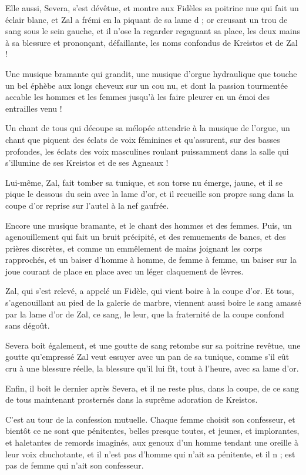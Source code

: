 \documentclass[a4paper, 11pt, oneside, polutonikogreek, french]{article}
\begin{document}
Elle aussi, Severa, s'est dévêtue, et montre aux Fidèles sa poitrine nue qui fait un éclair blanc, et Zal a frémi en la piquant de sa lame d ; or creusant un trou de sang sous le sein gauche, et il n'ose la regarder regagnant sa place, les deux mains à sa blessure et prononçant, défaillante, les noms confondus de Kreistos et de Zal !

Une musique bramante qui grandit, une musique d’orgue hydraulique que touche un bel éphèbe aux longs cheveux sur un cou nu, et dont la passion tourmentée accable les hommes et les femmes jusqu'à les faire pleurer en un émoi des entrailles venu !

Un chant de tous qui découpe sa mélopée attendrie à la musique de l'orgue, un chant que piquent des éclats de voix féminines et qu'assurent, sur des basses profondes, les éclats des voix masculines roulant puissamment dans la salle qui s'illumine de ses Kreistos et de ses Agneaux !

Lui-même, Zal, fait tomber sa tunique, et son torse nu émerge, jaune, et il se pique le dessous du sein avec la lame d'or, et il recueille son propre sang dans la coupe d'or reprise sur l'autel à la nef gaufrée.

Encore une musique bramante, et le chant des hommes et des femmes. Puis, un agenouillement qui fait un bruit précipité, et des remuements de bancs, et des prières discrètes, et comme un emmêlement de mains joignant les corps rapprochés, et un baiser d'homme à homme, de femme à femme, un baiser sur la joue courant de place en place avec un léger claquement de lèvres.

Zal, qui s'est relevé, a appelé un Fidèle, qui vient boire à la coupe d'or. Et tous, s'agenouillant au pied de la galerie de marbre, viennent aussi boire le sang amassé par la lame d'or de Zal, ce sang, le leur, que la fraternité de la coupe confond sans dégoût.

Severa boit également, et une goutte de sang retombe sur sa poitrine revêtue, une goutte qu'empressé Zal veut essuyer avec un pan de sa tunique, comme s'il eût cru à une blessure réelle, la blessure qu'il lui fît, tout à l'heure, avec sa lame d'or.

Enfin, il boit le dernier après Severa, et il ne reste plus, dans la coupe, de ce sang de tous maintenant prosternés dans la suprême adoration de Kreistos.

C'est au tour de la confession mutuelle. Chaque femme choisit son confesseur, et bientôt ce ne sont que pénitentes, belles presque toutes, et jeunes, et implorantes, et haletantes de remords imaginés, aux genoux d'un homme tendant une oreille à leur voix chuchotante, et il n'est pas d'homme qui n'ait sa pénitente, et il n ; est pas de femme qui n'ait son confesseur.
\end{document}
